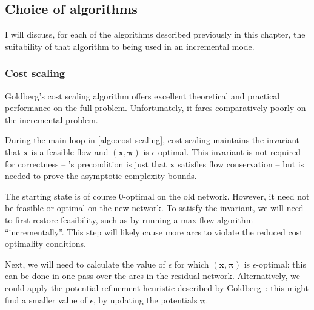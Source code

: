 
\subsection{Choice of algorithms}
I will discuss, for each of the algorithms described previously in this chapter, the suitability of that algorithm to being used in an incremental mode.

\subsubsection{Cost scaling} 
Goldberg's cost scaling algorithm offers excellent theoretical and practical performance on the full problem. Unfortunately, it fares comparatively poorly on the incremental problem. 

During the main loop in \cref{algo:cost-scaling}, cost scaling maintains the invariant that $\mathbf{x}$ is a feasible flow and $\left(\mathbf{x},\boldsymbol{\pi}\right)$ is $\epsilon$-optimal. This invariant is not required for correctness -- 's precondition is just that $\mathbf{x}$ satisfies flow conservation -- but is needed to prove the asymptotic complexity bounds.

The starting state is of course $0$-optimal on the old network. However, it need not be feasible or optimal on the new network. To satisfy the invariant, we will need to first restore feasibility, such as by running a max-flow algorithm ``incrementally''\footnotemark. This step will likely cause more arcs to violate the reduced cost optimality conditions.

Next, we will need to calculate the value of $\epsilon$ for which $\left(\mathbf{x},\boldsymbol{\pi}\right)$ is $\epsilon$-optimal: this can be done in one pass over the arcs in the residual network\footnotemark. Alternatively, we could apply the potential refinement heuristic described by Goldberg~\cite[\S3.2]{Goldberg:1997}: this might find a smaller value of $\epsilon$, by updating the potentials $\boldsymbol{\pi}$.


